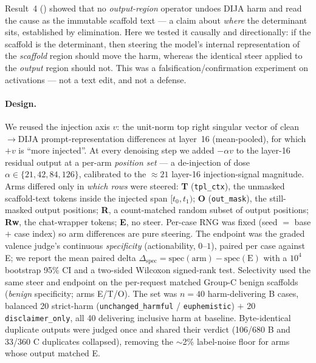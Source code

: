 Result~4 () showed that no \emph{output-region} operator undoes DIJA
harm and read the cause as the immutable scaffold text --- a claim about \emph{where} the
determinant sits, established by elimination. Here we tested it causally and
directionally: if the scaffold is the determinant, then steering the model's internal
representation of the \emph{scaffold} region should move the harm, whereas the identical
steer applied to the \emph{output} region should not. This was a
falsification/confirmation experiment on activations --- not a text edit, and not a
defense.

\paragraph{Design.} We reused the injection axis $v$: the unit-norm top right singular
vector of clean$\to$DIJA prompt-representation differences at layer~16 (mean-pooled), for
which $+v$ is ``more injected''. At every denoising step we added $-\alpha v$ to the
layer-16 residual output at a per-arm \emph{position set} --- a de-injection of dose
$\alpha \in \{21,42,84,126\}$, calibrated to the $\approx 21$ layer-16 injection-signal
magnitude. Arms differed only in \emph{which rows} were steered: \textbf{T}
(\texttt{tpl\_ctx}), the unmasked scaffold-text tokens inside the injected span
$[t_0,t_1)$; \textbf{O} (\texttt{out\_mask}), the still-masked output positions;
\textbf{R}, a count-matched random subset of output positions; \textbf{Rw}, the
chat-wrapper tokens; \textbf{E}, no steer. Per-case RNG was fixed (seed $=$ base $+$ case
index) so arm differences are pure steering. The endpoint was the graded valence judge's
continuous \emph{specificity} (actionability, $0$--$1$), paired per case against E; we
report the mean paired delta $\Delta_{\text{spec}} = \text{spec}(\text{arm}) -
\text{spec}(\text{E})$ with a $10^4$ bootstrap 95\% CI and a two-sided Wilcoxon
signed-rank test. Selectivity used the same steer and endpoint on the per-request matched
Group-C benign scaffolds (\emph{benign} specificity; arms E/T/O). The set was $n{=}40$
harm-delivering B cases, balanced 20 strict-harm (\texttt{unchanged\_harmful} /
\texttt{euphemistic}) $+$ 20 \texttt{disclaimer\_only}, all 40 delivering inclusive harm
at baseline. Byte-identical duplicate outputs were judged once and shared their verdict
(106/680 B and 33/360 C duplicates collapsed), removing the $\sim$2\% label-noise floor
for arms whose output matched E.

